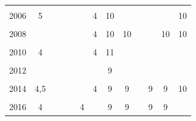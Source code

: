 \documentclass[12pt]{article}\usepackage[]{graphicx}\usepackage[]{color}
\begin{document}
\begin{landscapepage}
\begin{table}
{\begin{tabular}[t]{>{}c|ccccc>{}c|cccccc}
\cellcolor{gray!6}{2005} & \cellcolor{gray!6}{4} & \cellcolor{gray!6}{} & \cellcolor{gray!6}{} & \cellcolor{gray!6}{} & \cellcolor{gray!6}{} & \cellcolor{gray!6}{4} & \cellcolor{gray!6}{10} & \cellcolor{gray!6}{} & \cellcolor{gray!6}{} & \cellcolor{gray!6}{} & \cellcolor{gray!6}{10} & \cellcolor{gray!6}{10}\\
2006 & 5 &  &  &  &  & 4 & 10 &  &  &  &  & 10\\
\cellcolor{gray!6}{2007} & \cellcolor{gray!6}{4} & \cellcolor{gray!6}{} & \cellcolor{gray!6}{4} & \cellcolor{gray!6}{} & \cellcolor{gray!6}{4} & \cellcolor{gray!6}{4} & \cellcolor{gray!6}{10} & \cellcolor{gray!6}{} & \cellcolor{gray!6}{} & \cellcolor{gray!6}{} & \cellcolor{gray!6}{10} & \cellcolor{gray!6}{10}\\
2008 &  &  &  &  &  & 4 & 10 & 10 &  &  & 10 & 10\\
\cellcolor{gray!6}{2009} & \cellcolor{gray!6}{4} & \cellcolor{gray!6}{4} & \cellcolor{gray!6}{4} & \cellcolor{gray!6}{4} & \cellcolor{gray!6}{4} & \cellcolor{gray!6}{4} & \cellcolor{gray!6}{10} & \cellcolor{gray!6}{} & \cellcolor{gray!6}{} & \cellcolor{gray!6}{} & \cellcolor{gray!6}{} & \cellcolor{gray!6}{10}\\
2010 & 4 &  &  &  &  & 4 & 11 &  &  &  &  & \\
\cellcolor{gray!6}{2011} & \cellcolor{gray!6}{4} & \cellcolor{gray!6}{} & \cellcolor{gray!6}{} & \cellcolor{gray!6}{} & \cellcolor{gray!6}{} & \cellcolor{gray!6}{4} & \cellcolor{gray!6}{9} & \cellcolor{gray!6}{} & \cellcolor{gray!6}{} & \cellcolor{gray!6}{} & \cellcolor{gray!6}{} & \cellcolor{gray!6}{10}\\
2012 &  &  &  &  &  &  & 9 &  &  &  &  & \\
\cellcolor{gray!6}{2013} & \cellcolor{gray!6}{4} & \cellcolor{gray!6}{4} & \cellcolor{gray!6}{4} & \cellcolor{gray!6}{} & \cellcolor{gray!6}{} & \cellcolor{gray!6}{4} & \cellcolor{gray!6}{9} & \cellcolor{gray!6}{9} & \cellcolor{gray!6}{9} & \cellcolor{gray!6}{9} & \cellcolor{gray!6}{9} & \cellcolor{gray!6}{9}\\
2014 & 4,5 &  &  &  &  & 4 & 9 & 9 &  & 9 & 9 & 10\\
\cellcolor{gray!6}{2015} & \cellcolor{gray!6}{4} & \cellcolor{gray!6}{4} & \cellcolor{gray!6}{4} & \cellcolor{gray!6}{4} & \cellcolor{gray!6}{4} & \cellcolor{gray!6}{4} & \cellcolor{gray!6}{10} & \cellcolor{gray!6}{} & \cellcolor{gray!6}{9} & \cellcolor{gray!6}{9} & \cellcolor{gray!6}{9} & \cellcolor{gray!6}{9}\\
2016 & 4 &  &  &  & 4 &  & 9 & 9 &  & 9 & 9 & \\

\end{tabular}}
\end{table}
\end{landscapepage}
\end{document}
